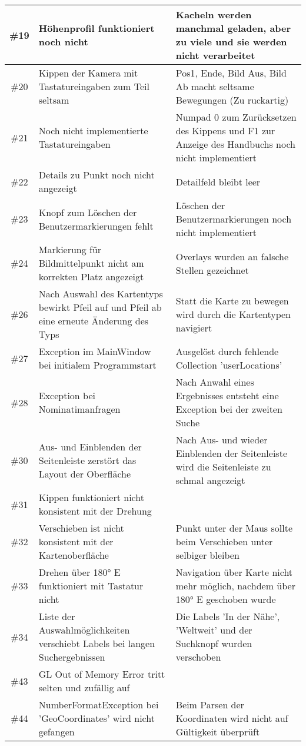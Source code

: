 \documentclass[10pt]{scrreprt}
\begin{document}
\begin{longtable}{|c|p{5.2cm}|p{8.2cm}|}
\hline
\#19 & Höhenprofil funktioniert noch nicht & Kacheln werden manchmal geladen, aber zu viele und sie werden nicht verarbeitet \\
\hline
\#20 & Kippen der Kamera mit Tastatureingaben zum Teil seltsam & Pos1, Ende, Bild Aus, Bild Ab macht seltsame Bewegungen (Zu ruckartig) \\
\hline
\#21 & Noch nicht implementierte Tastatureingaben & Numpad 0 zum Zurücksetzen des Kippens und F1 zur Anzeige des Handbuchs noch nicht implementiert \\
\hline
\#22 & Details zu Punkt noch nicht angezeigt & Detailfeld bleibt leer \\
\hline
\#23 & Knopf zum Löschen der Benutzermarkierungen fehlt & Löschen der Benutzermarkierungen noch nicht implementiert \\
\hline
\#24 & Markierung für Bildmittelpunkt nicht am korrekten Platz angezeigt & Overlays wurden an falsche Stellen gezeichnet \\
\hline
\#26 & Nach Auswahl des Kartentyps bewirkt Pfeil auf und Pfeil ab eine erneute Änderung des Typs & Statt die Karte zu bewegen wird durch die Kartentypen navigiert \\
\hline
\#27 & Exception im MainWindow bei initialem Programmstart & Ausgelöst durch fehlende Collection 'userLocations' \\
\hline
\#28 & Exception bei Nominatimanfragen & Nach Anwahl eines Ergebnisses entsteht eine Exception bei der zweiten Suche \\
\hline
\#30 & Aus- und Einblenden der Seitenleiste zerstört das Layout der Oberfläche & Nach Aus- und wieder Einblenden der Seitenleiste wird die Seitenleiste zu schmal angezeigt \\
\hline
\#31 & Kippen funktioniert nicht konsistent mit der Drehung & \\
\hline
\#32 & Verschieben ist nicht konsistent mit der Kartenoberfläche & Punkt unter der Maus sollte beim Verschieben unter selbiger bleiben \\
\hline
\#33 & Drehen über 180° E funktioniert mit Tastatur nicht & Navigation über Karte nicht mehr möglich, nachdem über 180° E geschoben wurde \\
\hline
\#34 & Liste der Auswahlmöglichkeiten verschiebt Labels bei langen Suchergebnissen & Die Labels 'In der Nähe', 'Weltweit' und der Suchknopf wurden verschoben \\
\hline
\#43 & GL Out of Memory Error tritt selten und zufällig auf & \\
\hline
\#44 & NumberFormatException bei 'GeoCoordinates' wird nicht gefangen & Beim Parsen der Koordinaten wird nicht auf Gültigkeit überprüft \\

\end{longtable}
\end{document}
